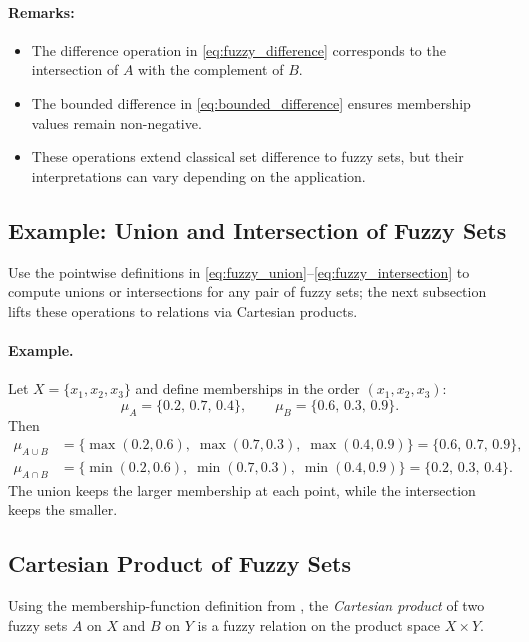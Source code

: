 \paragraph{Remarks:}
\begin{itemize}
    \item The difference operation in \eqref{eq:fuzzy_difference} corresponds to the intersection of \(A\) with the complement of \(B\).
    \item The bounded difference in \eqref{eq:bounded_difference} ensures membership values remain non-negative.
    \item These operations extend classical set difference to fuzzy sets, but their interpretations can vary depending on the application.
\end{itemize}

\subsection{Example: Union and Intersection of Fuzzy Sets}
\label{sec:fuzzysets_example_union_and_intersection_of_fuzzy_sets}

Use the pointwise definitions in \eqref{eq:fuzzy_union}--\eqref{eq:fuzzy_intersection} to compute unions or intersections for any pair of fuzzy sets; the next subsection lifts these operations to relations via Cartesian products.
\paragraph{Example.}
Let \(X=\{x_1,x_2,x_3\}\) and define memberships in the order \((x_1,x_2,x_3)\):
\[
\mu_A=\{0.2,\,0.7,\,0.4\}, \qquad \mu_B=\{0.6,\,0.3,\,0.9\}.
\]
Then
\begin{align*}
\mu_{A\cup B} &= \{\max(0.2,0.6),\; \max(0.7,0.3),\; \max(0.4,0.9)\} = \{0.6,\,0.7,\,0.9\},\\
\mu_{A\cap B} &= \{\min(0.2,0.6),\; \min(0.7,0.3),\; \min(0.4,0.9)\} = \{0.2,\,0.3,\,0.4\}.
\end{align*}
The union keeps the larger membership at each point, while the intersection keeps the smaller.

\subsection{Cartesian Product of Fuzzy Sets}
\label{sec:fuzzysets_cartesian_product_of_fuzzy_sets}

Using the membership-function definition from , the \emph{Cartesian product} of two fuzzy sets $A$ on $X$ and $B$ on $Y$ is a fuzzy relation on the product space $X \times Y$.

